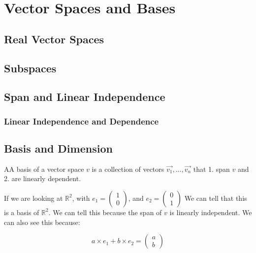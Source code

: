 \chapter{Vector Spaces and Bases}

\section{Real Vector Spaces}

\section{Subspaces}

\section{Span and Linear Independence}

  \subsection{Linear Independence and Dependence}
  
\section{Basis and Dimension}
  \begin{definition}
    AA basis of a vector space $v$ is a collection of vectors $\vec{v_1},\dots,\vec{v_n}$ that 1. span $v$ and 2. are linearly dependent.
  \end{definition}

  \begin{problem}
    If we are looking at $\mathbb{R}^2$, with $e_1=\left(\begin{smallmatrix}1\\0\end{smallmatrix}\right)$, and $e_2=\left(\begin{smallmatrix}0\\1\end{smallmatrix}\right)$
    We can tell that this is a basis of $\mathbb{R}^2$. We can tell this because the span of $v$ is linearly independent. We can also see this because:

    \begin{equation}
      a\times e_1+b\times e_2=\begin{pmatrix}a\\b\end{pmatrix}
    \end{equation}
  \end{problem}

